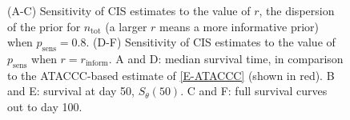 \documentclass[12pt, letterpaper]{article} %
\newcommand{\psens}{p_\text{sens}}
\newcommand{\ntot}{n_\text{tot}}
\newcommand{\inform}{{_{\text{inform}}}}
\begin{document}
\begin{figure}
  \vspace{-2.5cm}
  \caption{%
    (A-C) Sensitivity of CIS estimates to the value of $r$, the dispersion of the prior for $\ntot$ (a larger $r$ means a more informative prior) when $\psens = 0.8$.
    (D-F) Sensitivity of CIS estimates to the value of $\psens$ when $r = r\inform$.
    A and D: median survival time, in comparison to the ATACCC-based estimate of \cref{E-ATACCC} (shown in red).
    B and E: survival at day 50, $S_\theta(50)$.
    C and F: full survival curves out to day 100.
  }
  \label{imperf-test:fig:cis-sensitivity}
\end{figure}
\end{document}
